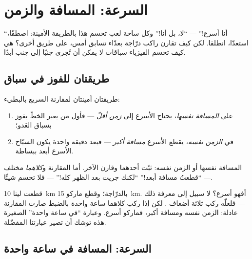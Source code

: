 \chapter{السرعة: المسافة والزمن}\label{ch:g5:speed-distance-time}

``أنا أسرع!'' --- ``لا، بل أنا!'' وكل ساحة لعب تحسم هذا بالطريقة
الأمينة: اصطفّا، استعدّا، انطلقا. لكن كيف تقارن راكب درّاجة
بعدّاء تسابق أمس، على طريق أخرى؟  هي كيف تحسم الفيزياء
سباقات لا يمكن أن تُجرى جنبًا إلى جنب أبدًا.

\section{طريقتان للفوز في سباق}

\begin{proposition}\label{prop:g5:speed-distance-time:rules}
طريقتان أمينتان لمقارنة السريع بالبطيء:
\begin{enumerate}
  \item على \emph{المسافة نفسها}، يحتاج الأسرع إلى \emph{زمن
        أقلّ} --- فأول من يعبر الخطّ يفوز بسباق العَدو؛
  \item في \emph{الزمن نفسه}، يقطع الأسرع \emph{مسافة أكبر} ---
        فبعد دقيقة واحدة يكون السبّاح الأسرع أبعد ببساطة.
\end{enumerate}
المسافة نفسها أو الزمن نفسه: ثبّت أحدهما وقارن الآخر. أما
المقارنة و\emph{كلاهما} مختلف --- ``قطعتُ مسافة أبعد!'' ``لكنك
جريت بعد الظهر كله!'' --- فلا تحسم شيئًا.
\end{proposition}

\begin{example}\label{ex:g5:speed-distance-time:fair}
قطعت لينا \qty{10}{km} بالدرّاجة؛ وقطع ماركو \qty{15}{km}. أفهو
أسرع؟ لا سبيل إلى معرفة ذلك --- فلعلّه ركب ثلاثة أضعاف .
لكن إذا ركب كلاهما ساعة واحدة بالضبط صارت المقارنة عادلة: الزمن
نفسه ومسافة أكبر، فماركو أسرع. وعبارة ``في ساعة واحدة'' الصغيرة
هذه توشك أن تصير عبارتنا المفضّلة.
\end{example}

\section{السرعة: المسافة في ساعة واحدة}

